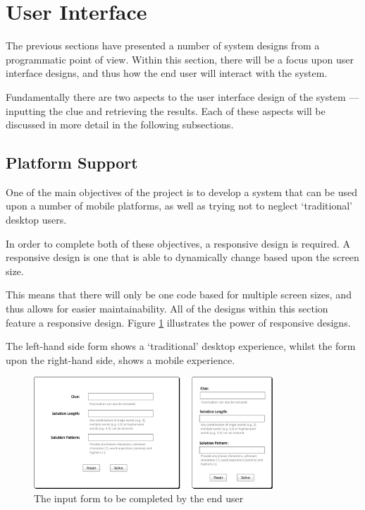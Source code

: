 \section{User Interface}
\label{sec:design_user_interface}

The previous sections have presented a number of system designs from a 
programmatic point of view. Within this section, there will be a focus upon 
user interface designs, and thus how the end user will interact with the system.

Fundamentally there are two aspects to the user interface design of the system 
--- inputting the clue and retrieving the results. Each of these aspects will 
be discussed in more detail in the following subsections.


\subsection{Platform Support} 
\label{sub:platform_support}

One of the main objectives of the project is to develop a system that can be 
used upon a number of mobile platforms, as well as trying not to neglect 
`traditional' desktop users.

In order to complete both of these objectives, a responsive design is required.
A responsive design is one that is able to dynamically change based upon the 
screen size.

This means that there will only be one code based for multiple screen sizes, and
thus allows for easier maintainability. All of the designs within this section 
feature a responsive design. Figure \ref{fig:input_form_compare} illustrates the
power of responsive designs.

The left-hand side form shows a `traditional' desktop experience, whilst the 
form upon the right-hand side, shows a mobile experience.

\begin{figure}[H]
  \centering
  \includegraphics[width=0.8\textwidth]{ui/form_comparison.jpg}
  \caption{The input form to be completed by the end user}
  \label{fig:input_form_compare}
\end{figure}


